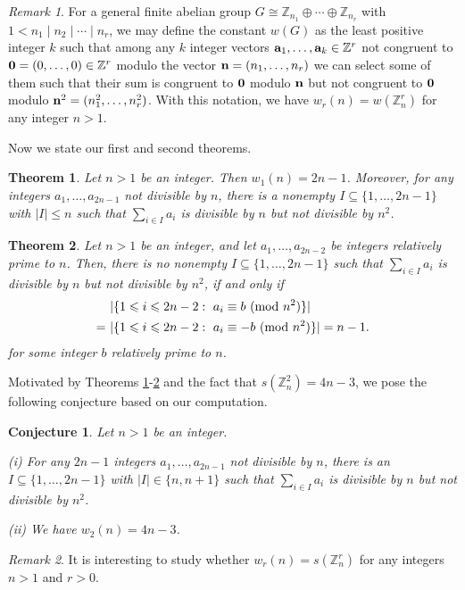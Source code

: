 \documentclass[11pt,reqno]{amsart}
\def\pmod #1{\ ({\rm{mod}}\ #1)}
\def\Z{\mathbb Z}
\def\ls{\leqslant}
\def\se {\subseteq}
\def\eq{\equiv}
\theoremstyle{plain}
\newtheorem{theorem}{Theorem}
\newtheorem{conjecture}{Conjecture}
\theoremstyle{definition}
\theoremstyle{remark}
\newtheorem{remark}{Remark}
\begin{document}
\begin{remark} For a general finite abelian group
$G\cong\Z_{n_1}\oplus\cdots\oplus \Z_{n_r}$ with $1<n_1\mid n_2\mid\cdots\mid n_r$, we may define
the constant $w(G)$ as the least positive integer $k$ such that among any $k$ integer vectors
${\bf a}_1,\ldots,{\bf a}_k\in\Z^r$ not congruent to ${\bf 0}=(0,\ldots,0)\in\Z^r$ modulo the vector ${\bf n}=(n_1,\ldots,n_r)$ we can select some of them such that their sum is congruent to ${\bf 0}$
modulo ${\bf n}$ but not congruent to ${\bf 0}$ modulo ${\bf n}^2=(n_1^2,\ldots,n_r^2)$.
With this notation, we have $w_r(n)=w(\Z_n^r)$ for any integer $n>1$.
\end{remark}


Now we state our first and second theorems.

\begin{theorem}\label{Th-2n-1} Let $n>1$ be an integer. Then $w_1(n)=2n-1$.
Moreover, for any integers $a_1,\ldots,a_{2n-1}$
 not divisible by $n$,  there is a nonempty $I\se\{1,\ldots,2n-1\}$
with $|I|\ls n$ such that $\sum_{i\in I}a_i$ is divisible by $n$ but not divisible by $n^2$.
\end{theorem}

\begin{theorem} \label{Th-2n-2} Let $n>1$ be an integer, and let
$a_1,\ldots,a_{2n-2}$ be integers relatively prime to $n$. Then, there is no nonempty $I\se\{1,\ldots,2n-1\}$ such that $\sum_{i\in I}a_i$
is divisible by $n$ but not divisible by $n^2$, if and only if
\begin{equation}\label{b}
\begin{aligned}&\ |\{1\ls i\ls 2n-2:\ a_i\eq b\pmod{n^2}\}|
\\=&\ |\{1\ls i\ls 2n-2:\ a_i\eq -b\pmod{n^2}\}|=n-1.
\end{aligned}
\end{equation}
for some integer $b$ relatively prime to $n$.
\end{theorem}

Motivated by Theorems \ref{Th-2n-1}-\ref{Th-2n-2} and the fact that $s(\Z_n^2)=4n-3$, we pose the following conjecture
based on our computation.

\begin{conjecture} Let $n>1$ be an integer.

{\rm (i)} For any $2n-1$ integers $a_1,\ldots,a_{2n-1}$ not divisible by $n$, there is an $I\se\{1,\ldots,2n-1\}$ with $|I|\in\{n,n+1\}$ such that $\sum_{i\in I}a_i$ is divisible by $n$
but not divisible by $n^2$.

{\rm (ii)} We have $w_2(n)=4n-3$.
\end{conjecture}
\begin{remark} It is interesting to study whether $w_r(n)=s(\Z_n^r)$ for any integers $n>1$ and $r>0$.
\end{remark}
\end{document}
